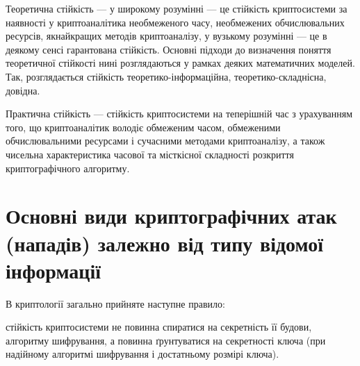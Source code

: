 \begin{definition}
    Теоретична стійкість ---  у широкому розумінні --- це стійкість
    криптосистеми за наявності у криптоаналітика необмеженого часу, необмежених
    обчислювальних ресурсів, якнайкращих методів криптоаналізу, у вузькому
    розумінні --- це в деякому сенсі гарантована стійкість. Основні підходи до
    визначення поняття теоретичної стійкості нині розглядаються у рамках деяких
    математичних моделей. Так, розглядається стійкість теоретико-інформаційна,
    теоретико-складнісна, довідна.
\end{definition}

\begin{definition}
    Практична стійкість --- стійкість криптосистеми на теперішній час з
    урахуванням того, що криптоаналітик володіє обмеженим часом,
    обмеженими обчислювальними ресурсами і сучасними методами криптоаналізу,  а
    також чисельна характеристика часової та місткісної складності розкриття
    криптографічного алгоритму.
\end{definition}

\section{Основні види криптографічних атак (нападів) залежно від типу відомої
    інформації}

В криптології загально прийняте наступне правило: 
\begin{definition}\label{def:KerckhoffsPrinciple}
    стійкість криптосистеми не повинна спиратися на секретність її будови,
    алгоритму шифрування, а повинна ґрунтуватися на секретності ключа (при
    надійному алгоритмі шифрування і достатньому розмірі ключа). 
\end{definition}

